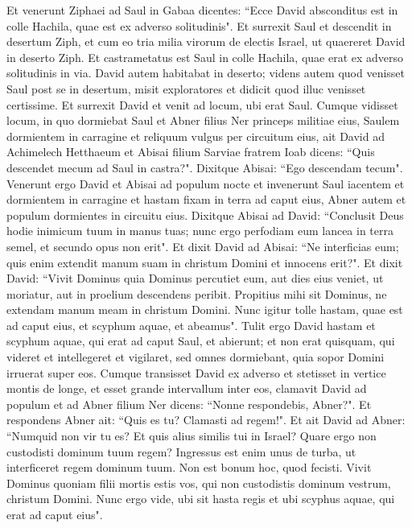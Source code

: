 \begin{biblechapter}  
\verse Et venerunt Ziphaei ad Saul in Gabaa dicentes: “Ecce David absconditus est in colle Hachila, quae est ex adverso solitudinis". 
\verse Et surrexit Saul et descendit in desertum Ziph, et cum eo tria milia virorum de electis Israel, ut quaereret David in deserto Ziph. 
\verse Et castrametatus est Saul in colle Hachila, quae erat ex adverso solitudinis in via. David autem habitabat in deserto; videns autem quod venisset Saul post se in desertum, 
\verse misit exploratores et didicit quod illuc venisset certissime. 
\verse Et surrexit David et venit ad locum, ubi erat Saul. Cumque vidisset locum, in quo dormiebat Saul et Abner filius Ner princeps militiae eius, Saulem dormientem in carragine et reliquum vulgus per circuitum eius, 
\verse ait David ad Achimelech Hetthaeum et Abisai filium Sarviae fratrem Ioab dicens: “Quis descendet mecum ad Saul in castra?". Dixitque Abisai: “Ego descendam tecum". 
\verse Venerunt ergo David et Abisai ad populum nocte et invenerunt Saul iacentem et dormientem in carragine et hastam fixam in terra ad caput eius, Abner autem et populum dormientes in circuitu eius. 
\verse Dixitque Abisai ad David: “Conclusit Deus hodie inimicum tuum in manus tuas; nunc ergo perfodiam eum lancea in terra semel, et secundo opus non erit". 
\verse Et dixit David ad Abisai: “Ne interficias eum; quis enim extendit manum suam in christum Domini et innocens erit?". 
\verse Et dixit David: “Vivit Dominus quia Dominus percutiet eum, aut dies eius veniet, ut moriatur, aut in proelium descendens peribit. 
\verse Propitius mihi sit Dominus, ne extendam manum meam in christum Domini. Nunc igitur tolle hastam, quae est ad caput eius, et scyphum aquae, et abeamus".  
\verse Tulit ergo David hastam et scyphum aquae, qui erat ad caput Saul, et abierunt; et non erat quisquam, qui videret et intellegeret et vigilaret, sed omnes dormiebant, quia sopor Domini irruerat super eos. 
\verse Cumque transisset David ex adverso et stetisset in vertice montis de longe, et esset grande intervallum inter eos, 
\verse clamavit David ad populum et ad Abner filium Ner dicens: “Nonne respondebis, Abner?". Et respondens Abner ait: “Quis es tu? Clamasti ad regem!". 
\verse Et ait David ad Abner: “Numquid non vir tu es? Et quis alius similis tui in Israel? Quare ergo non custodisti dominum tuum regem? Ingressus est enim unus de turba, ut interficeret regem dominum tuum. 
\verse Non est bonum hoc, quod fecisti. Vivit Dominus quoniam filii mortis estis vos, qui non custodistis dominum vestrum, christum Domini. Nunc ergo vide, ubi sit hasta regis et ubi scyphus aquae, qui erat ad caput eius". 

\end{biblechapter}
